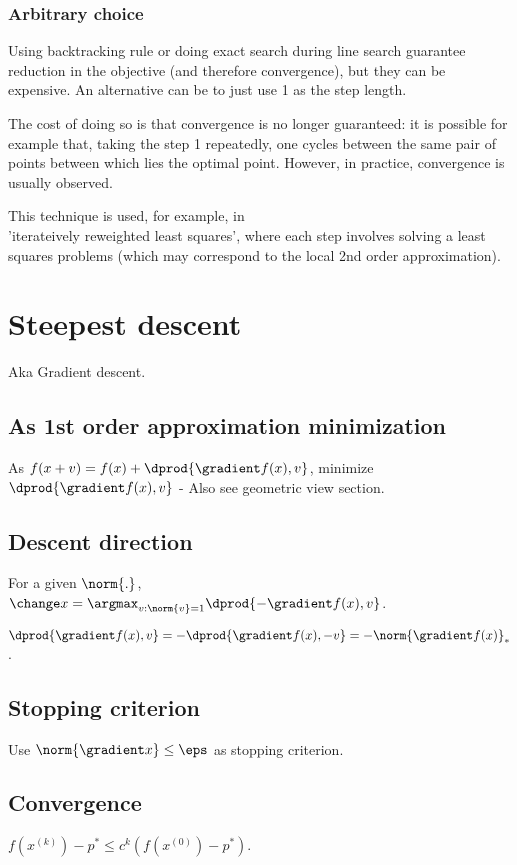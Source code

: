 \documentclass[oneside, article]{memoir}
\begin{document}
\subsubsection{Arbitrary choice}
Using backtracking rule or doing exact search during line search guarantee reduction in the objective (and therefore convergence), but they can be expensive. An alternative can be to just use 1 as the step length.

The cost of doing so is that convergence is no longer guaranteed: it is possible for example that, taking the step 1 repeatedly, one cycles between the same pair of points between which lies the optimal point. However, in practice, convergence is usually observed.

This technique is used, for example, in \\
'iterateively reweighted least squares', where each step involves solving a least squares problems (which may correspond to the local 2nd order approximation).

\section{Steepest descent}
Aka Gradient descent.

\subsection{As 1st order approximation minimization}
As $f(x + v) = f(x) + \dprod{\gradient f(x), v}$, minimize $\dprod{\gradient f(x), v}$ - Also see geometric view section.

\subsection{Descent direction}
For a given $\norm{.}$, $\change x = \argmax_{v: \norm{v} = 1} \dprod{-\gradient f(x), v}$.

$\dprod{\gradient f(x), v}= -\dprod{\gradient f(x), -v} = -\norm{\gradient f(x)}_*$. 

\subsection{Stopping criterion}
Use $\norm{\gradient x} \leq \eps$ as stopping criterion.

\subsection{Convergence}
$f(x^{(k)}) - p^{*} \leq c^{k}(f(x^{(0)}) - p^{*})$. \why
\end{document}
